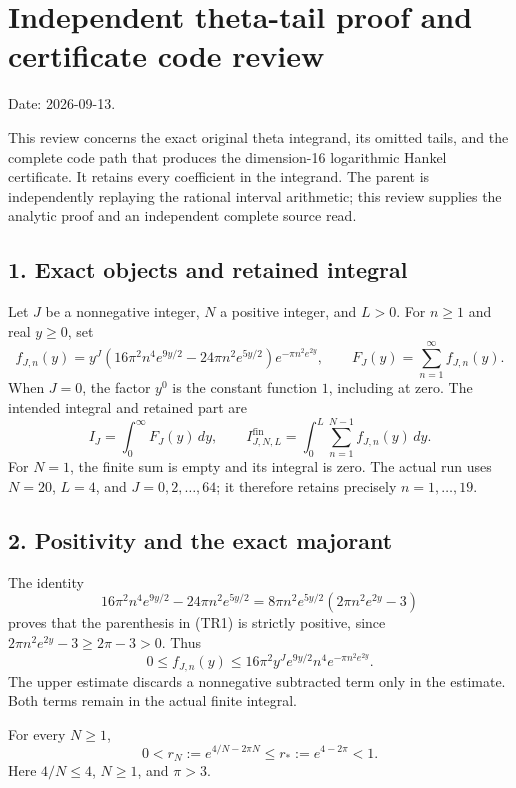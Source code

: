 \section{Independent theta-tail proof and certificate code review}\label{independent-theta-tail-proof-and-certificate-code-review}

Date: 2026-09-13.

This review concerns the exact original theta integrand, its omitted tails, and the complete code path that produces the dimension-16 logarithmic Hankel certificate. It retains every coefficient in the integrand. The parent is independently replaying the rational interval arithmetic; this review supplies the analytic proof and an independent complete source read.

\subsection{1. Exact objects and retained integral}\label{exact-objects-and-retained-integral}

Let \(J\) be a nonnegative integer, \(N\) a positive integer, and \(L>0\). For \(n\geq1\) and real \(y\geq0\), set \[
 f_{J,n}(y)=y^J
 \left(16\pi^2n^4e^{9y/2}-24\pi n^2e^{5y/2}\right)
 e^{-\pi n^2e^{2y}},
 \qquad F_J(y)=\sum_{n=1}^{\infty}f_{J,n}(y).
 \tag{TR1}
\] When \(J=0\), the factor \(y^0\) is the constant function \(1\), including at zero. The intended integral and retained part are \[
 I_J=\int_0^\infty F_J(y)\,dy,\qquad
 I_{J,N,L}^{\mathrm{fin}}=\int_0^L\sum_{n=1}^{N-1}f_{J,n}(y)\,dy.
 \tag{TR2}
\] For \(N=1\), the finite sum is empty and its integral is zero. The actual run uses \(N=20\), \(L=4\), and \(J=0,2,\ldots,64\); it therefore retains precisely \(n=1,\ldots,19\).

\subsection{2. Positivity and the exact majorant}\label{positivity-and-the-exact-majorant}

The identity \[
 16\pi^2n^4e^{9y/2}-24\pi n^2e^{5y/2}
 =8\pi n^2e^{5y/2}(2\pi n^2e^{2y}-3)
 \tag{TR3}
\] proves that the parenthesis in (TR1) is strictly positive, since \(2\pi n^2e^{2y}-3\geq2\pi-3>0\). Thus \[
 0\leq f_{J,n}(y)
 \leq16\pi^2y^Je^{9y/2}n^4e^{-\pi n^2e^{2y}}.
 \tag{TR4}
\] The upper estimate discards a nonnegative subtracted term only in the estimate. Both terms remain in the actual finite integral.

For every \(N\geq1\), \[
 0<r_N:=e^{4/N-2\pi N}
 \leq r_*:=e^{4-2\pi}<1.
 \tag{TR5}
\] Here \(4/N\leq4\), \(N\geq1\), and \(\pi>3\).

